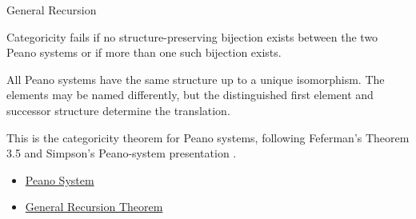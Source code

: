 \begin{topicbox}{General Recursion}
\begin{remark*}
Categoricity fails if no structure-preserving bijection exists between the two
Peano systems or if more than one such bijection exists.
\end{remark*}

\begin{remark*}[Interpretation]
All Peano systems have the same structure up to a unique isomorphism. The
elements may be named differently, but the distinguished first element and
successor structure determine the translation.
\end{remark*}

\begin{remark*}
This is the categoricity theorem for Peano systems, following Feferman's
Theorem 3.5 and Simpson's Peano-system presentation
\citep{feferman1964numbersystems,simpson2011peanosystems}.
\end{remark*}

\begin{remark*}[Dependencies]
\begin{itemize}
  \item \hyperref[def:peano-system]{Peano System}
  \item \hyperref[thm:general-recursion-theorem-for-peano-system]{General Recursion Theorem}
\end{itemize}
\end{remark*}
\end{topicbox}
